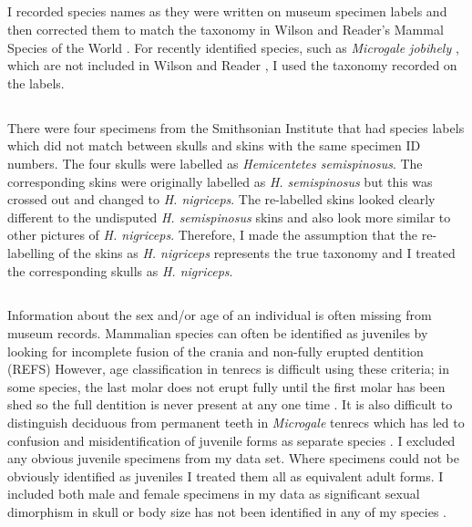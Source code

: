 \subsection{}
	I recorded species names as they were written on museum specimen labels and then corrected them to match the taxonomy in Wilson and Reader’s Mammal Species of the World \citeyearpar{Wilson2005}. For recently identified species, such as \textit{Microgale jobihely} \citep{Goodman2006}, which are not included in Wilson and Reader \citeyearpar{Wilson2005}, I used the taxonomy recorded on the labels. 

\subsection{}
	
	There were four specimens from the Smithsonian Institute that had species labels which did not match between skulls and skins with the same specimen ID numbers. The four skulls were labelled as \textit{Hemicentetes semispinosus}. The corresponding skins were originally labelled as \textit{H. semispinosus} but this was crossed out and changed to \textit{H. nigriceps}. The re-labelled skins looked clearly different to the undisputed \textit{H. semispinosus} skins and also look more similar to other pictures of \textit{H. nigriceps}. Therefore, I made the assumption that the re-labelling of the skins as \textit{H. nigriceps} represents the true taxonomy and I treated the corresponding skulls as \textit{H. nigriceps}.

\subsection{}


	Information about the sex and/or age of an individual is often missing from museum records. Mammalian species can often be identified as juveniles by looking for incomplete fusion of the crania and non-fully erupted dentition (REFS) However, age classification in tenrecs is difficult using these criteria; in some species, the last molar does not erupt fully until the first molar has been shed so the full dentition is never present at any one time \citep{Nowak1983}. It is also difficult to distinguish deciduous from permanent teeth in \textit{Microgale} tenrecs \citep{Asher2008} which has led to confusion and misidentification of juvenile forms as separate species \citep{Olson2004}. I excluded any obvious juvenile specimens from my data set. Where specimens could not be obviously identified as juveniles I treated them all as equivalent adult forms. 	
	I included both male and female specimens in my data as significant sexual dimorphism in skull or body size has not been identified in any of my species \citep[REFS][]{Olson2004}.


